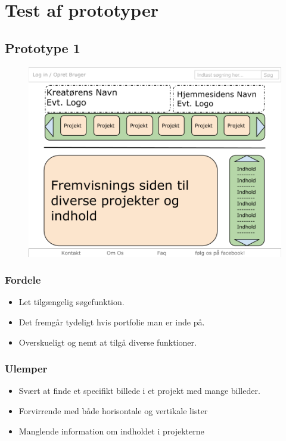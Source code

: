\documentclass[a4paper,titlepage,fleqn,12pt]{article}
\begin{document}
\section{Test af prototyper}

\subsection{Prototype 1}

\begin{figure}[H]
	\includegraphics[width=\textwidth]{hjemmesidedesign1.png}
	
\end{figure}

\subsubsection{Fordele}

\begin{itemize}
	\item Let tilgængelig søgefunktion.
	\item Det fremgår tydeligt hvis portfolie man er inde på.
	\item Overskueligt og nemt at tilgå diverse funktioner.
\end{itemize}

\subsubsection{Ulemper}
\begin{itemize}
	\item Svært at finde et specifikt billede i et projekt med mange billeder. 
	\item Forvirrende med både horisontale og vertikale lister
	\item Manglende information om indholdet i projekterne
\end{itemize}
\end{document}
